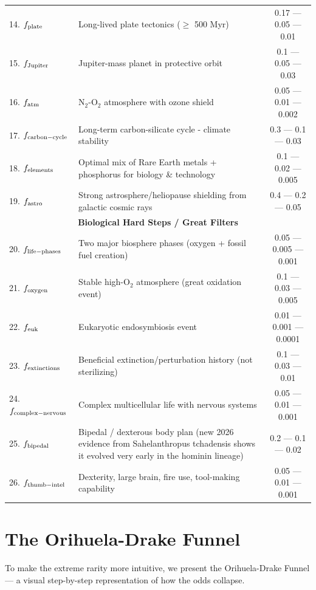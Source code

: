 \documentclass[12pt]{article}
\begin{document}
\begin{table}[H]
\begin{tabular}{l p{} c}
14. $f_{\rm plate}$ & Long-lived plate tectonics ($\geq$ 500 Myr) & 0.17 — 0.05 — 0.01 \\
15. $f_{\rm Jupiter}$ & Jupiter-mass planet in protective orbit & 0.1 — 0.05 — 0.03 \\
16. $f_{\rm atm}$ & N$_2$-O$_2$ atmosphere with ozone shield & 0.05 — 0.01 — 0.002 \\
17. $f_{\rm carbon-cycle}$ & Long-term carbon-silicate cycle - climate stability & 0.3 — 0.1 — 0.03 \\
18. $f_{\rm elements}$ & Optimal mix of Rare Earth metals + phosphorus for biology \& technology & 0.1 — 0.02 — 0.005 \\
19. $f_{\rm astro}$ & Strong astrosphere/heliopause shielding from galactic cosmic rays & 0.4 — 0.2 — 0.05 \\
\midrule
\multicolumn{3}{c}{\textbf{Biological Hard Steps / Great Filters}} \\
\midrule
20. $f_{\rm life-phases}$ & Two major biosphere phases (oxygen + fossil fuel creation) & 0.05 — 0.005 — 0.001 \\
21. $f_{\rm oxygen}$ & Stable high-O$_2$ atmosphere (great oxidation event) & 0.1 — 0.03 — 0.005 \\
22. $f_{\rm euk}$ & Eukaryotic endosymbiosis event & 0.01 — 0.001 — 0.0001 \\
23. $f_{\rm extinctions}$ & Beneficial extinction/perturbation history (not sterilizing) & 0.1 — 0.03 — 0.01 \\
24. $f_{\rm complex-nervous}$ & Complex multicellular life with nervous systems & 0.05 — 0.01 — 0.001 \\
25. $f_{\rm bipedal}$ & Bipedal / dexterous body plan (new 2026 evidence from Sahelanthropus tchadensis shows it evolved very early in the hominin lineage) & 0.2 — 0.1 — 0.02 \\
26. $f_{\rm thumb-intel}$ & Dexterity, large brain, fire use, tool-making capability & 0.05 — 0.01 — 0.001 \\
\bottomrule
\end{tabular}
\end{table}

\section{The Orihuela-Drake Funnel}
To make the extreme rarity more intuitive, we present the Orihuela-Drake Funnel — a visual step-by-step representation of how the odds collapse.
\end{document}

